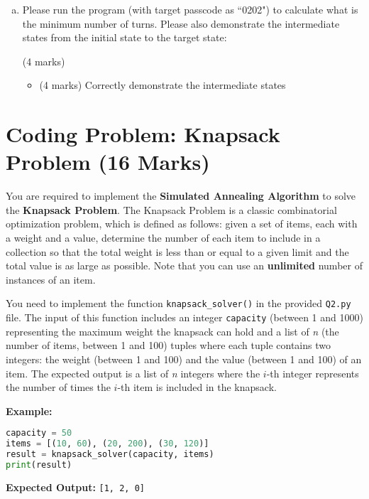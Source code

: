 \documentclass[12pt]{article}
\begin{document}
\begin{enumerate}[(a)]
    \item
          Please run the program (with target passcode as ``0202") to calculate what is the minimum number of turns. Please also demonstrate the intermediate states from the initial state to the target state:
          \begin{markscheme} (4 marks)
              \begin{itemize}
                  \item (4 marks) Correctly demonstrate the intermediate states
              \end{itemize}
          \end{markscheme}

\end{enumerate}

\section{Coding Problem: Knapsack Problem (16 Marks)}

You are required to implement the \textbf{Simulated Annealing Algorithm} to solve the \textbf{Knapsack Problem}.
The Knapsack Problem is a classic combinatorial optimization problem, which is defined as follows: given a set of items, each with a weight and a value, determine the number of each item to include in a collection so that the total weight is less than or equal to a given limit and the total value is as large as possible.
Note that you can use an \textbf{unlimited} number of instances of an item.

You need to implement the function \texttt{knapsack\_solver()} in the provided \texttt{Q2.py} file.
The input of this function includes an integer \texttt{capacity} (between 1 and 1000) representing the maximum weight the knapsack can hold and a list of \textit{n} (the number of items, between 1 and 100) tuples where each tuple contains two integers: the weight (between 1 and 100) and the value (between 1 and 100) of an item.
The expected output is a list of \textit{n} integers where the $i$-th integer represents the number of times the $i$-th item is included in the knapsack.

\textbf{Example:}

\begin{lstlisting}[language=python]
capacity = 50
items = [(10, 60), (20, 200), (30, 120)]
result = knapsack_solver(capacity, items)
print(result)
\end{lstlisting}

\textbf{Expected Output:} \texttt{[1, 2, 0]}
\end{document}
